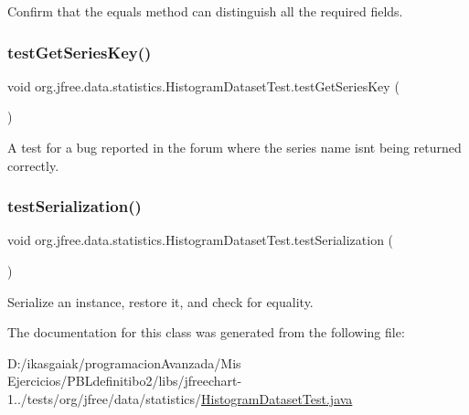 Confirm that the equals method can distinguish all the required fields. \mbox{\label{classorg_1_1jfree_1_1data_1_1statistics_1_1_histogram_dataset_test_a8e251428ec7c769f4ddea4d77b7399f9}} 
\subsubsection{\texorpdfstring{test\+Get\+Series\+Key()}{testGetSeriesKey()}}
{\footnotesize\ttfamily void org.\+jfree.\+data.\+statistics.\+Histogram\+Dataset\+Test.\+test\+Get\+Series\+Key (\begin{DoxyParamCaption}{ }\end{DoxyParamCaption})}

A test for a bug reported in the forum where the series name isn\textquotesingle{}t being returned correctly. \mbox{\label{classorg_1_1jfree_1_1data_1_1statistics_1_1_histogram_dataset_test_a6b52efaa050fdc67ce8817027d86732a}} 
\subsubsection{\texorpdfstring{test\+Serialization()}{testSerialization()}}
{\footnotesize\ttfamily void org.\+jfree.\+data.\+statistics.\+Histogram\+Dataset\+Test.\+test\+Serialization (\begin{DoxyParamCaption}{ }\end{DoxyParamCaption})}

Serialize an instance, restore it, and check for equality. 

The documentation for this class was generated from the following file\+:\begin{DoxyCompactItemize}
\item 
D\+:/ikasgaiak/programacion\+Avanzada/\+Mis Ejercicios/\+P\+B\+Ldefinitibo2/libs/jfreechart-\/1../tests/org/jfree/data/statistics/\mbox{\hyperlink{_histogram_dataset_test_8java}{Histogram\+Dataset\+Test.\+java}}\end{DoxyCompactItemize}

